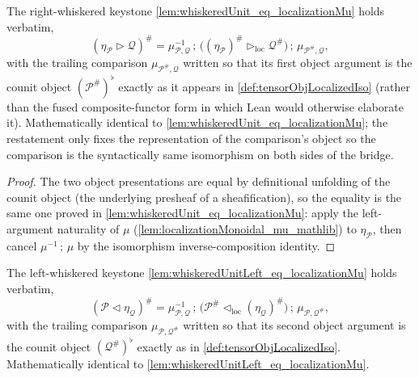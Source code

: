 \begin{lemma}
  \label{lem:whiskeredUnit_eq_localizationMu_canonical}
  The right-whiskered keystone \cref{lem:whiskeredUnit_eq_localizationMu} holds
  verbatim,
  \[
    (\eta_{\mathcal{P}} \rhd \mathcal{Q})^{\#}
      = \mu_{\mathcal{P},\mathcal{Q}}^{-1} \,;\,
        \bigl((\eta_{\mathcal{P}})^{\#} \rhd_{\mathrm{loc}} \mathcal{Q}^{\#}\bigr)
        \,;\, \mu_{\mathcal{P}^{\#},\mathcal{Q}},
  \]
  with the trailing comparison \(\mu_{\mathcal{P}^{\#},\mathcal{Q}}\) written so that
  its first object argument is the counit object
  \((\mathcal{P}^{\#})^{\flat}\) exactly as it appears in
  \cref{def:tensorObjLocalizedIso} (rather than the fused composite-functor form in
  which Lean would otherwise elaborate it). Mathematically identical to
  \cref{lem:whiskeredUnit_eq_localizationMu}; the restatement only fixes the
  representation of the comparison's object so the comparison is the syntactically
  same isomorphism on both sides of the bridge.
\end{lemma}

\begin{proof}
  The two object presentations are equal by definitional unfolding of the counit
  object (the underlying presheaf of a sheafification), so the equality is the same
  one proved in \cref{lem:whiskeredUnit_eq_localizationMu}: apply
  the left-argument naturality of \(\mu\) (\cref{lem:localizationMonoidal_mu_mathlib}) to
  \(\eta_{\mathcal{P}}\), then cancel \(\mu^{-1}\,;\,\mu\) by the isomorphism
  inverse-composition identity.
\end{proof}

\begin{lemma}
  \label{lem:whiskeredUnitLeft_eq_localizationMu_canonical}
  The left-whiskered keystone \cref{lem:whiskeredUnitLeft_eq_localizationMu} holds
  verbatim,
  \[
    (\mathcal{P} \lhd \eta_{\mathcal{Q}})^{\#}
      = \mu_{\mathcal{P},\mathcal{Q}}^{-1} \,;\,
        \bigl(\mathcal{P}^{\#} \lhd_{\mathrm{loc}} (\eta_{\mathcal{Q}})^{\#}\bigr)
        \,;\, \mu_{\mathcal{P},\mathcal{Q}^{\#}},
  \]
  with the trailing comparison \(\mu_{\mathcal{P},\mathcal{Q}^{\#}}\) written so that
  its second object argument is the counit object \((\mathcal{Q}^{\#})^{\flat}\)
  exactly as in \cref{def:tensorObjLocalizedIso}. Mathematically identical to
  \cref{lem:whiskeredUnitLeft_eq_localizationMu}.
\end{lemma}


